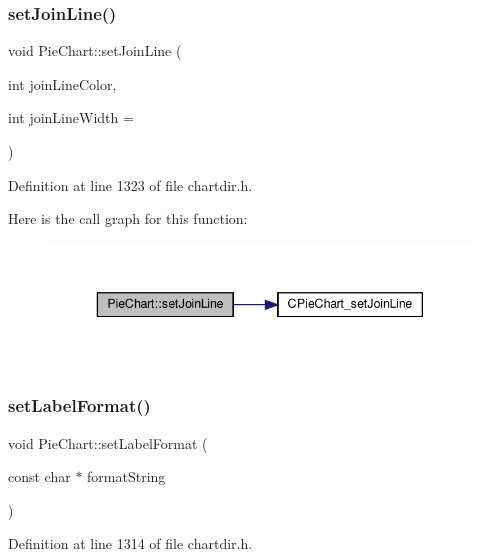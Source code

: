 \subsubsection{\texorpdfstring{set\+Join\+Line()}{setJoinLine()}}
{\footnotesize\ttfamily void Pie\+Chart\+::set\+Join\+Line (\begin{DoxyParamCaption}\item[{int}]{join\+Line\+Color,  }\item[{int}]{join\+Line\+Width = {} }\end{DoxyParamCaption})\hspace{0.3cm}{\ttfamily [inline]}}



Definition at line 1323 of file chartdir.\+h.

Here is the call graph for this function\+:
\nopagebreak
\begin{figure}[H]
\begin{center}
\leavevmode
\includegraphics[width=343pt]{class_pie_chart_ac78c35a17fa478ad58e4e3c19141778d_cgraph}
\end{center}
\end{figure}
\mbox{\label{class_pie_chart_adc0379ce4654443993084784745bf3ad}} 
\subsubsection{\texorpdfstring{set\+Label\+Format()}{setLabelFormat()}}
{\footnotesize\ttfamily void Pie\+Chart\+::set\+Label\+Format (\begin{DoxyParamCaption}\item[{const char $\ast$}]{format\+String }\end{DoxyParamCaption})\hspace{0.3cm}{\ttfamily [inline]}}



Definition at line 1314 of file chartdir.\+h.

